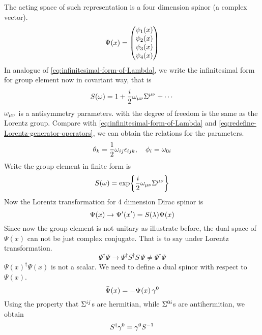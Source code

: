 The acting space of such representation is a four dimension spinor (a complex vector).
\begin{equation}
  \Psi(x) = \mqty(\psi_1(x)\\ \psi_2(x)\\ \psi_3(x)\\ \psi_4(x))
\end{equation}
In analogue of \eqref{eq:infinitesimal-form-of-Lambda}, we write the infinitesimal form for group element now in covariant way, that is
\begin{equation} \label{the infinitesimal form of Sla}
S(\omega) = 1+ \frac{i}{2}\omega_{\mu\nu}\Sigma^{\mu\nu}+\cdots
\end{equation}
$\omega_{\mu\nu}$ is a antisymmetry parameters. with the degree of freedom is the same as the Lorentz group. Compare with \eqref{eq:infinitesimal-form-of-Lambda} and \eqref{eq:redefine-Lorentz-generator-operators}, we can obtain the relations for the parameters.
\begin{equation} \label{parameter redefinition}
\theta_k = \frac{1}{2} \omega_{ij}\epsilon_{ijk}, \quad \phi_i = \omega_{0i}
\end{equation}
Write the group element in finite form is
\begin{equation} \label{the finite form of Sla}
S(\omega) = \exp{\frac{i}{2}\omega_{\mu\nu}\Sigma^{\mu\nu}}
\end{equation}
Now the Lorentz transformation for 4 dimension Dirac spinor  is
\begin{equation} \label{Lorentz transformation of Dirac spinor}
\Psi(x)\rightarrow\Psi'(x') = S(\lambda)\Psi(x)
\end{equation}
Since now the group element is not unitary as illustrate before, the dual space of $\Psi(x)$ can not be just complex conjugate. That is to say under Lorentz  transformation.
\begin{equation}
  \Psi^{\dagger} \Psi
\rightarrow
\Psi^{\dagger} S^{\dagger} S \, \Psi \neq \Psi^{\dagger} \Psi
\end{equation}
$\Psi(x)^{\dagger} \Psi(x) $ is not a scalar.
We need to define a dual spinor with respect to $\Psi(x)$.
\begin{equation} \label{definition of dual spinor}
\bar{\Psi}(x) = -\Psi(x)\,\gamma^0
\end{equation}
Using the property that $\Sigma^{ij}$s are hermitian, while $\Sigma^{0i}$s are antihermitian, we obtain
\begin{equation} \label{property of S(lambda)}
S^{\dagger} \gamma^0 = \gamma^0 S^{-1}
\end{equation}
